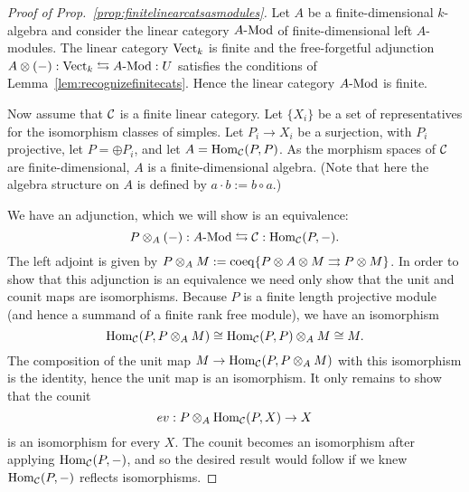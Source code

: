 \documentclass{amsart}
\begin{document}
\begin{proof}[Proof of Prop.~\ref{prop:finitelinearcatsasmodules}]
	Let $A$ be a finite-dimensional $k$-algebra and consider the linear category $\Mod{A}{}$ of finite-dimensional left $A$-modules. The linear category $\mathrm{Vect}_k$ is finite and the  free-forgetful adjunction $A\otimes(-): \Vect_k \leftrightarrows \Mod{A}{}: U$ satisfies the conditions of Lemma~\ref{lem:recognizefinitecats}. Hence the linear category $\Mod{A}{}$ is finite.
	
	
	
	
	Now assume that $\mathcal C$ is a finite linear category. Let $\{X_i\}$ be a set of representatives for the isomorphism classes of simples. Let $P_i \to X_i$ be a surjection, with $P_i$ projective, let $P = \oplus P_i$, and let $A = \operatorname{Hom}_{\mathcal C}(P,P)$. As the morphism spaces of $\mathcal C$ are finite-dimensional, $A$ is a finite-dimensional algebra.  (Note that here the algebra structure on $A$ is defined by $a \cdot b := b \circ a$.)
	
We have an adjunction, which we will show is an equivalence:
	\begin{equation*}
		P \otimes_A (-):\Mod{A}{} \leftrightarrows \cC: \Hom_{\cC}(P,-).
	\end{equation*}
	The left adjoint is given by $P \otimes_A M := \operatorname{coeq}\{ P \otimes A \otimes M \rightrightarrows P \otimes M\}$.  In order to show that this adjunction is an equivalence we need only show that the unit and counit maps are isomorphisms.
Because $P$ is a finite length projective module (and hence a summand of a finite rank free module), we have an isomorphism
\begin{equation*}
	\operatorname{Hom}_{\mathcal C}(P, P \otimes_A M) \cong \operatorname{Hom}_{\mathcal C}(P, P) \otimes_A M \cong M.
\end{equation*}
The composition of the unit map $M \rightarrow\operatorname{Hom}_{\mathcal C}(P, P \otimes_A M)$ with this isomorphism is the identity, hence the unit map is an isomorphism. It only remains to show that the counit 
\begin{equation*}
	ev:P \otimes_A \operatorname{Hom}_{\mathcal C}(P, X) \to X
\end{equation*}
is an isomorphism for every $X$. The counit becomes an isomorphism after applying $\operatorname{Hom}_{\mathcal C}(P,-)$, and so the desired result would follow if we knew $\operatorname{Hom}_{\mathcal C}(P,-)$ reflects isomorphisms.


\end{proof}
\end{document}
